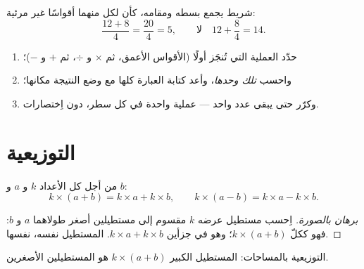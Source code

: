 \begin{remark}
شريط  يجمع بسطه ومقامه، كأن لكل
منهما أقواسًا غير مرئية:
\[
\frac{12 + 8}{4} = \frac{20}{4} = 5,
\qquad\text{لا}\quad 12 + \frac{8}{4} = 14 .
\]
\end{remark}

\begin{method}\label{met:g7:priorities:safe}
\begin{enumerate}
  \item حدّد العملية التي تُنجَز أولًا (الأقواس الأعمق، ثم
        $\times$ و $\div$، ثم $+$ و $-$)؛
  \item واحسب \emph{تلك وحدها}، وأعد كتابة العبارة كلها
        مع وضع النتيجة مكانها؛
  \item وكرّر حتى يبقى عدد واحد --- عملية واحدة في كل سطر، دون
        اِختصارات.
\end{enumerate}
\end{method}

\section{التوزيعية}

\begin{theorem}[التوزيعية]\label{thm:g7:priorities:distributivity}
من أجل كل الأعداد $k$ و $a$ و $b$:
\[
k \times (a + b) = k \times a + k \times b,
\qquad
k \times (a - b) = k \times a - k \times b .
\]
\end{theorem}

\begin{proof}[برهان بالصورة]
اِحسب  مستطيل عرضه $k$ مقسوم إلى مستطيلين
أصغر طولاهما $a$ و $b$: فهو ككلّ $k \times (a+b)$؛
وهو في جزأين $k \times a + k \times b$. المستطيل نفسه، 
نفسها.
\end{proof}

\begin{omfigure}

{\small التوزيعية بالمساحات: المستطيل الكبير
$k \times (a + b)$ هو  المستطيلين الأصغرين.}
\end{omfigure}

